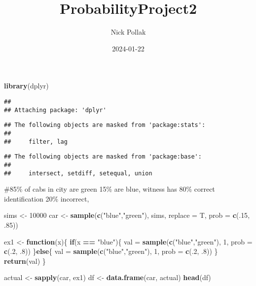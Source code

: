 \documentclass[
]{article}
\title{ProbabilityProject2}
\author{Nick Pollak}
\date{2024-01-22}
\newenvironment{Shaded}{\begin{snugshade}}{\end{snugshade}}
\newcommand{\AttributeTok}[1]{\textcolor[rgb]{0.13,0.29,0.53}{#1}}
\newcommand{\ControlFlowTok}[1]{\textcolor[rgb]{0.13,0.29,0.53}{\textbf{#1}}}
\newcommand{\DecValTok}[1]{\textcolor[rgb]{0.00,0.00,0.81}{#1}}
\newcommand{\FunctionTok}[1]{\textcolor[rgb]{0.13,0.29,0.53}{\textbf{#1}}}
\newcommand{\NormalTok}[1]{#1}
\newcommand{\OtherTok}[1]{\textcolor[rgb]{0.56,0.35,0.01}{#1}}
\newcommand{\SpecialCharTok}[1]{\textcolor[rgb]{0.81,0.36,0.00}{\textbf{#1}}}
\newcommand{\StringTok}[1]{\textcolor[rgb]{0.31,0.60,0.02}{#1}}
\begin{document}
\maketitle

\begin{Shaded}
\begin{Highlighting}[]
\FunctionTok{library}\NormalTok{(dplyr)}
\end{Highlighting}
\end{Shaded}

\begin{verbatim}
## 
## Attaching package: 'dplyr'
\end{verbatim}

\begin{verbatim}
## The following objects are masked from 'package:stats':
## 
##     filter, lag
\end{verbatim}

\begin{verbatim}
## The following objects are masked from 'package:base':
## 
##     intersect, setdiff, setequal, union
\end{verbatim}

\#85\% of cabs in city are green 15\% are blue, witness has 80\% correct
identification 20\% incorrect,

\begin{Shaded}
\begin{Highlighting}[]
\NormalTok{sims }\OtherTok{\textless{}{-}} \DecValTok{10000}
\NormalTok{car }\OtherTok{\textless{}{-}} \FunctionTok{sample}\NormalTok{(}\FunctionTok{c}\NormalTok{(}\StringTok{"blue"}\NormalTok{,}\StringTok{"green"}\NormalTok{), sims, }\AttributeTok{replace =}\NormalTok{ T, }\AttributeTok{prob =} \FunctionTok{c}\NormalTok{(.}\DecValTok{15}\NormalTok{, .}\DecValTok{85}\NormalTok{))}

\NormalTok{ex1 }\OtherTok{\textless{}{-}} \ControlFlowTok{function}\NormalTok{(x)\{}
  \ControlFlowTok{if}\NormalTok{(x }\SpecialCharTok{==} \StringTok{"blue"}\NormalTok{)\{}
\NormalTok{    val }\OtherTok{=} \FunctionTok{sample}\NormalTok{(}\FunctionTok{c}\NormalTok{(}\StringTok{"blue"}\NormalTok{,}\StringTok{"green"}\NormalTok{), }\DecValTok{1}\NormalTok{, }\AttributeTok{prob =} \FunctionTok{c}\NormalTok{(.}\DecValTok{2}\NormalTok{, .}\DecValTok{8}\NormalTok{))}
\NormalTok{  \}}\ControlFlowTok{else}\NormalTok{\{}
\NormalTok{    val }\OtherTok{=} \FunctionTok{sample}\NormalTok{(}\FunctionTok{c}\NormalTok{(}\StringTok{"blue"}\NormalTok{,}\StringTok{"green"}\NormalTok{), }\DecValTok{1}\NormalTok{, }\AttributeTok{prob =} \FunctionTok{c}\NormalTok{(.}\DecValTok{2}\NormalTok{, .}\DecValTok{8}\NormalTok{))}
\NormalTok{  \}}
  \FunctionTok{return}\NormalTok{(val)}
\NormalTok{\}}

\NormalTok{actual }\OtherTok{\textless{}{-}} \FunctionTok{sapply}\NormalTok{(car, ex1)}
\NormalTok{df }\OtherTok{\textless{}{-}} \FunctionTok{data.frame}\NormalTok{(car, actual)}
\FunctionTok{head}\NormalTok{(df)}
\end{Highlighting}
\end{Shaded}
\end{document}
